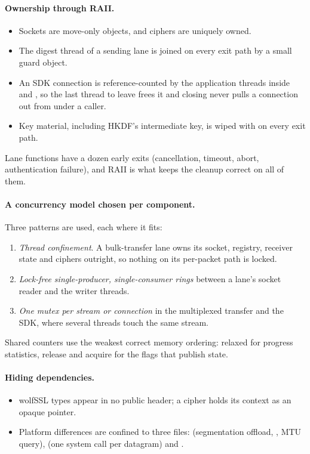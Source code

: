 \paragraph{Ownership through RAII.}
\begin{itemize}
  \item Sockets are move-only objects, and ciphers are uniquely owned.
  \item The digest thread of a sending lane is joined on every exit path by a small guard object.
  \item An SDK connection is reference-counted by the application threads inside  and
    , so the last thread to leave frees it and closing never pulls a connection out from under a
    caller.
  \item Key material, including HKDF's intermediate key, is wiped with  on every exit path.
\end{itemize}
Lane functions have a dozen early exits (cancellation, timeout, abort, authentication failure), and RAII is what
keeps the cleanup correct on all of them.

\paragraph{A concurrency model chosen per component.} Three patterns are used, each where it fits:
\begin{enumerate}
  \item \emph{Thread confinement}. A bulk-transfer lane owns its socket, registry, receiver state and ciphers
    outright, so nothing on its per-packet path is locked.
  \item \emph{Lock-free single-producer, single-consumer rings} between a lane's socket reader and the writer
    threads.
  \item \emph{One mutex per stream or connection} in the multiplexed transfer and the SDK, where several
    threads touch the same stream.
\end{enumerate}
Shared counters use the weakest correct memory ordering: relaxed for progress statistics, release and acquire
for the flags that publish state.

\paragraph{Hiding dependencies.}
\begin{itemize}
  \item wolfSSL types appear in no public header; a cipher holds its context as an opaque pointer.
  \item Platform differences are confined to three files:  (segmentation offload,
    , MTU query),  (one system call per datagram) and
    .
\end{itemize}

